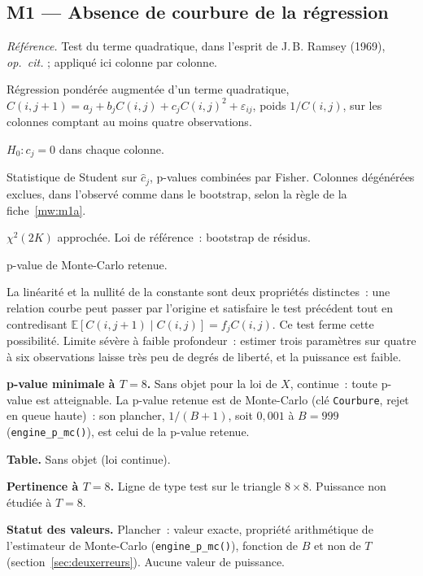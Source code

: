 \documentclass[a4paper,11pt]{article}
\newcommand{\code}[1]{\texttt{\small #1}}
\newcommand{\refl}[1]{{\small\textcolor{maincolor!70!black}{\textit{Référence.} #1}}\par\smallskip}
\newcounter{ficheid}
\newenvironment{fiche}[1]{%
  \stepcounter{ficheid}%
  \phantomsection
  \subsection{#1}%
  \label{fiche:\theficheid}%
}{%
  \end{description}\vspace{0.5em}%
}
\newcommand{\Cadre}{%
  \begin{description}[leftmargin=0pt, style=unboxed, itemsep=3pt, topsep=3pt, parsep=2pt]%
  \item[\textcolor{financeblue}{\textbf{1. Cadre, notations et hypothèses de validité (non testées).}}]}
\newcommand{\Hzero}{\item[\textcolor{financeblue}{\textbf{2. Hypothèse nulle.}}]}
\newcommand{\Stat}{\item[\textcolor{financeblue}{\textbf{3. Statistique de test.}}]}
\newcommand{\Loi}{\item[\textcolor{financeblue}{\textbf{4. Loi sous $H_0$.}}]}
\newcommand{\Pval}{\item[\textcolor{financeblue}{\textbf{5. p-value.}}]}
\newcommand{\Usage}{\item[\textcolor{financeblue}{\textbf{6. Usage et limites.}}]}
\newcommand{\Pertinence}{\item[\textcolor{financeblue}{\textbf{7. Pertinence et puissance à faible $T$.}}]}
\begin{document}
\begin{fiche}{M1 --- Absence de courbure de la régression}
\label{mw:m1c}
\refl{Test du terme quadratique, dans l'esprit de J.\,B. Ramsey (1969),
\emph{op.\ cit.} ; appliqué ici colonne par colonne.}
\Cadre
Régression pondérée augmentée d'un terme quadratique,
$C(i,j+1) = a_j + b_j C(i,j) + c_j C(i,j)^2 + \varepsilon_{ij}$, poids
$1/C(i,j)$, sur les colonnes comptant au moins quatre observations.
\Hzero
$H_0 : c_j = 0$ dans chaque colonne.
\Stat
Statistique de Student sur $\hat c_j$, p-values combinées par Fisher. Colonnes dégénérées
exclues, dans l'observé comme dans le bootstrap, selon la règle de la fiche~\ref{mw:m1a}.
\Loi
$\chi^2(2K)$ approchée. Loi de référence~: bootstrap de résidus.
\Pval
p-value de Monte-Carlo retenue.
\Usage
La linéarité et la nullité de la constante sont deux propriétés distinctes~: une
relation courbe peut passer par l'origine et satisfaire le test précédent tout en
contredisant $\mathbb{E}[C(i,j+1)\mid C(i,j)] = f_j C(i,j)$. Ce test ferme cette
possibilité. Limite sévère à faible profondeur~: estimer trois paramètres sur
quatre à six observations laisse très peu de degrés de liberté, et la puissance
est faible.
\Pertinence
\textbf{p-value minimale à $T = 8$.} Sans objet pour la loi de $X$, continue~: toute p-value est atteignable. La p-value retenue est de Monte-Carlo (clé \code{Courbure}, rejet en queue haute)~: son plancher, $1/(B+1)$, soit $0{,}001$ à $B = 999$ (\code{engine\_p\_mc()}), est celui de la p-value retenue.

\textbf{Table.} Sans objet (loi continue).

\textbf{Pertinence à $T = 8$.} Ligne de type test sur le triangle $8\times 8$. Puissance non étudiée à $T = 8$.

\textbf{Statut des valeurs.} Plancher~: valeur exacte, propriété arithmétique de l'estimateur de Monte-Carlo (\code{engine\_p\_mc()}), fonction de $B$ et non de $T$ (section~\ref{sec:deuxerreurs}). Aucune valeur de puissance.
\end{fiche}
\end{document}
